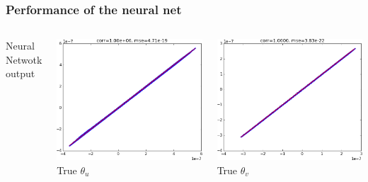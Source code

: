 \documentclass[handout]{beamer}
\begin{document}
\begin{frame}
\frametitle{Performance of the neural net}
\begin{columns}[t]
\begin{turn}{90}
Neural Netwotk output
\end{turn}
\centering
\includegraphics[width=\textwidth]{./fig/L3/scat_upar.png}\\
True $\theta_u$

\centering
\includegraphics[width=\textwidth]{./fig/L3/scat_vpar.png}\\
True $\theta_v$
\end{columns}
\end{frame}
\end{document}
